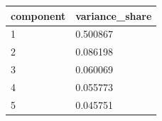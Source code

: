 \begin{tabular}{ll}
\hline
component & variance\_share \\
\hline
1 & 0.500867 \\
2 & 0.086198 \\
3 & 0.060069 \\
4 & 0.055773 \\
5 & 0.045751 \\
\hline
\end{tabular}
